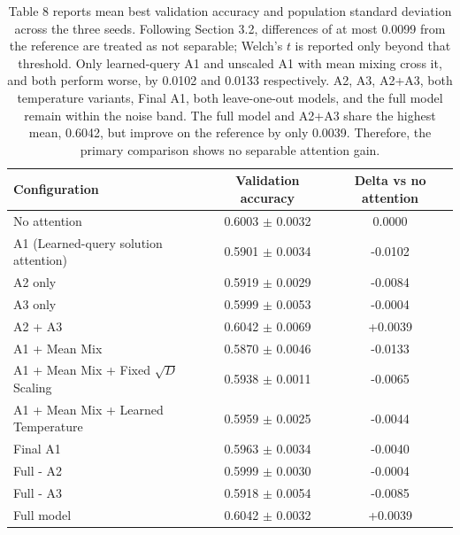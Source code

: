 \documentclass[11pt]{article}
\begin{document}
\begin{table}[t]
  \centering
  \small
  \caption{Table 8 reports mean best validation accuracy and population standard deviation across the three seeds. Following Section 3.2, differences of at most 0.0099 from the reference are treated as not separable; Welch's $t$ is reported only beyond that threshold. Only learned-query A1 and unscaled A1 with mean mixing cross it, and both perform worse, by 0.0102 and 0.0133 respectively. A2, A3, A2+A3, both temperature variants, Final A1, both leave-one-out models, and the full model remain within the noise band. The full model and A2+A3 share the highest mean, 0.6042, but improve on the reference by only 0.0039. Therefore, the primary comparison shows no separable attention gain.}
  \label{tab:2}
  \begin{tabular}{@{}lcc@{}}
    \toprule
    \textbf{Configuration} & \textbf{Validation accuracy} & \textbf{Delta vs no attention} \\
    \midrule
    No attention & 0.6003 $\pm$ 0.0032 & 0.0000 \\
    A1 (Learned-query solution attention) & 0.5901 $\pm$ 0.0034 & -0.0102 \\
    A2 only & 0.5919 $\pm$ 0.0029 & -0.0084 \\
    A3 only & 0.5999 $\pm$ 0.0053 & -0.0004 \\
    A2 + A3 & 0.6042 $\pm$ 0.0069 & +0.0039 \\
    A1 + Mean Mix & 0.5870 $\pm$ 0.0046 & -0.0133 \\
    A1 + Mean Mix + Fixed $\sqrt{D}$ Scaling & 0.5938 $\pm$ 0.0011 & -0.0065 \\
    A1 + Mean Mix + Learned Temperature & 0.5959 $\pm$ 0.0025 & -0.0044 \\
    Final A1 & 0.5963 $\pm$ 0.0034 & -0.0040 \\
    Full - A2 & 0.5999 $\pm$ 0.0030 & -0.0004 \\
    Full - A3 & 0.5918 $\pm$ 0.0054 & -0.0085 \\
    Full model & 0.6042 $\pm$ 0.0032 & +0.0039 \\
    \bottomrule
  \end{tabular}
\end{table}
\end{document}

